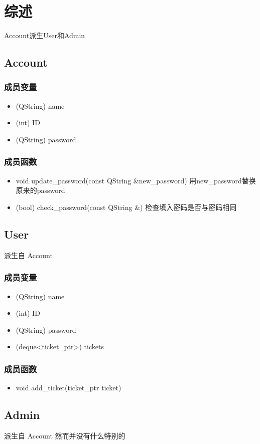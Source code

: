 \section{综述}
    Account派生User和Admin
    
\subsection{Account}
    \subsubsection{成员变量}
    \begin{itemize}
        \item (QString) name
        \item (int) ID
        \item (QString) password
    \end{itemize}

    \subsubsection{成员函数}
    \begin{itemize}
    \item void update_password(const QString &new_password)
    用new_password替换原来的password
    
    \item (bool) check_password(const QString &)
    检查填入密码是否与密码相同
    \end{itemize}

\subsection{User}
    派生自 Account
    \subsubsection{成员变量}
    \begin{itemize}
        \item (QString) name
        \item (int) ID
        \item (QString) password
        \item (deque<ticket_ptr>) tickets
    \end{itemize}

    \subsubsection{成员函数}
    \begin{itemize}
        \item void add_ticket(ticket_ptr ticket)
    \end{itemize}

\subsection{Admin}
    派生自 Account
    然而并没有什么特别的